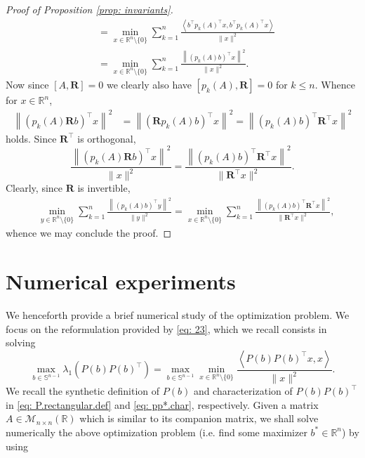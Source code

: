 \documentclass[11pt, a4paper, reqno]{amsart}
\newcommand{\R}{\mathbb{R}}
\def\*#1{\mathbf{#1}}
\theoremstyle{plain}
\numberwithin{equation}{section}
\begin{document}
\begin{proof}[Proof of Proposition \ref{prop: invariants}]
\begin{align*}
	 &=  \min_{x \in \R^n \setminus\{0\}} \sum_{k=1}^n \frac{\left\langle b^\top p_k(A)^\top x, b^\top p_k(A)^\top x\right\rangle}{\|x\|^2} \\
	 &= \min_{x \in \R^n \setminus\{0\}} \sum_{k=1}^n \frac{\left\|(p_k(A)b)^\top x\right\|^2}{\|x\|^2}.
	\end{align*}
	Now since $[A, \*R]=0$ we clearly also have $[p_k(A), \*R]=0$ for $k\leqslant n$. Whence for $x\in\R^n$,
	\begin{align*}
	\left\|(p_k(A)\*Rb)^\top x \right\|^2 &= \left\|(\*Rp_k(A)b)^\top x \right\|^2 = \left\|(p_k(A)b)^\top \*R^\top x \right\|^2
	\end{align*}
	holds. Since $\*R^\top$ is orthogonal, 
	\begin{equation*}
	\frac{\left\|(p_k(A)\*Rb)^\top x \right\|^2}{\|x\|^2} =  \frac{\left\|(p_k(A)b)^\top \*R^\top x \right\|^2}{\|\*R^\top x\|^2}.
	\end{equation*}
	Clearly, since $\*R$ is invertible, 
	\begin{align*}
	&\min_{y \in \R^n \setminus\{0\}} \sum_{k=1}^n \frac{\left\|(p_k(A)b)^\top y\right\|^2}{\|y\|^2} = \min_{x \in \R^n \setminus\{0\}} \sum_{k=1}^n   \frac{\left\|(p_k(A)b)^\top \*R^\top x \right\|^2}{\|\*R^\top x\|^2},
	\end{align*}
	whence we may conclude the proof.
	\end{proof}


	\section{Numerical experiments} \label{sec: numerics} 
	
	We henceforth provide a brief numerical study of the optimization problem. We focus on the reformulation provided by \eqref{eq: 23}, which we recall consists in solving
	\begin{equation}
	\max_{b\in\mathbb{S}^{n-1}} \lambda_1\left(P(b)P(b)^\top\right) = \max_{b\in\mathbb{S}^{n-1}} \min_{x\in \R^n\setminus\{0\}} \frac{\left\langle P(b)P(b)^\top x,x\right\rangle}{\|x\|^2}.
	\end{equation}
	We recall the synthetic definition of $P(b)$ and characterization of $P(b)P(b)^\top$ in \eqref{eq: P.rectangular.def} and \eqref{eq: pp*.char}, respectively. Given a matrix $A\in\mathcal{M}_{n\times n}(\R)$ which is similar to its companion matrix, we shall solve numerically the above optimization problem (i.e. find some maximizer $b^*\in\R^n$) by using 
\end{document}
